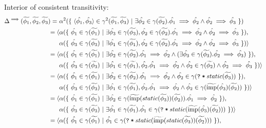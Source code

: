 \documentclass[11pt,a4paper]{article}
\newcommand{\ttt}{\texttt}
\newcommand{\grad}[1]{\widetilde{#1}}
\newcommand{\qm}{\ttt{?}}
\newcommand{\withqm}[1]{\ttt{\qm\:*\:$#1$}}
\newcommand{\imp}{\textrm{imp}}
\begin{document}
Interior of consistent transitivity:
\begin{align*}
\Delta^{\implies}(\grad{\phi_1}, \grad{\phi_2}, \grad{\phi_3})
=~&\alpha^2(\{~ \langle \hat{\phi_1}, \hat{\phi_3} \rangle \in \gamma^2(\grad{\phi_1}, \grad{\phi_3}) ~|~ \exists \hat{\phi_2} \in \gamma(\grad{\phi_2}). \hat{\phi_1} \implies \hat{\phi_2} \wedge \hat{\phi_2} \implies \hat{\phi_3} ~\}) \\
= \langle 
&\alpha(\{~ \hat{\phi_1} \in \gamma(\grad{\phi_1}) ~|~ \exists \hat{\phi_3} \in \gamma(\grad{\phi_3}), \hat{\phi_2} \in \gamma(\grad{\phi_2}). \hat{\phi_1} \implies \hat{\phi_2} \wedge \hat{\phi_2} \implies \hat{\phi_3} ~\}),\\
&\alpha(\{~ \hat{\phi_3} \in \gamma(\grad{\phi_3}) ~|~ \exists \hat{\phi_1} \in \gamma(\grad{\phi_1}), \hat{\phi_2} \in \gamma(\grad{\phi_2}). \hat{\phi_1} \implies \hat{\phi_2} \wedge \hat{\phi_2} \implies \hat{\phi_3} ~\})
\rangle\\
= \langle 
&\alpha(\{~ \hat{\phi_1} \in \gamma(\grad{\phi_1}) ~|~ \exists \hat{\phi_2} \in \gamma(\grad{\phi_2}). \hat{\phi_1} \implies \hat{\phi_2} \wedge (\exists \hat{\phi_3} \in \gamma(\grad{\phi_3}). \hat{\phi_2} \implies \hat{\phi_3}) ~\}),\\
&\alpha(\{~ \hat{\phi_3} \in \gamma(\grad{\phi_3}) ~|~ \exists \hat{\phi_1} \in \gamma(\grad{\phi_1}), \hat{\phi_2}. \hat{\phi_1} \implies \hat{\phi_2} \wedge \hat{\phi_2} \in \gamma(\grad{\phi_2}) \wedge \hat{\phi_2} \implies \hat{\phi_3} ~\})
\rangle\\
= \langle 
&\alpha(\{~ \hat{\phi_1} \in \gamma(\grad{\phi_1}) ~|~ \exists \hat{\phi_2} \in \gamma(\grad{\phi_2}). \hat{\phi_1} \implies \hat{\phi_2} \wedge \hat{\phi_2} \in \gamma(\withqm{static(\grad{\phi_3})}) ~\}),\\
&\alpha(\{~ \hat{\phi_3} \in \gamma(\grad{\phi_3}) ~|~ \exists \hat{\phi_1} \in \gamma(\grad{\phi_1}), \hat{\phi_2}. \hat{\phi_1} \implies \hat{\phi_2} \wedge \hat{\phi_2} \in \gamma(\grad{\imp}(\hat{\phi_3})(\grad{\phi_2})) ~\})
\rangle\\
= \langle 
&\alpha(\{~ \hat{\phi_1} \in \gamma(\grad{\phi_1}) ~|~ \exists \hat{\phi_2} \in \gamma(\grad{\imp}(static(\grad{\phi_3}))(\grad{\phi_2})). \hat{\phi_1} \implies \hat{\phi_2} ~\}),\\
&\alpha(\{~ \hat{\phi_3} \in \gamma(\grad{\phi_3}) ~|~ \exists \hat{\phi_1} \in \gamma(\grad{\phi_1}). \hat{\phi_1} \in \gamma(\withqm{static(\grad{\imp}(\hat{\phi_3})(\grad{\phi_2}))}) ~\})
\rangle\\
= \langle 
&\alpha(\{~ \hat{\phi_1} \in \gamma(\grad{\phi_1}) ~|~ \hat{\phi_1} \in \gamma(\withqm{static(\grad{\imp}(static(\grad{\phi_3}))(\grad{\phi_2}))}) ~\}),\\

\end{align*}
\end{document}
